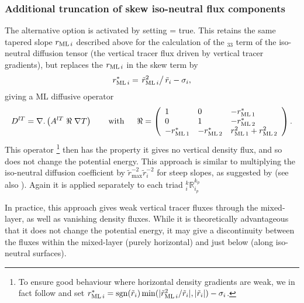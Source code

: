 \documentclass[../tex_main/NEMO_manual]{subfiles}
\begin{document}
\subsubsection{Additional truncation of skew iso-neutral flux components}
\label{subsec:Gerdes-taper}
The alternative option is activated by setting  = true.
This retains the same tapered slope $r_{\mathrm{ML}\,i}$  described above for the calculation of the $_{33}$ term of
the iso-neutral diffusion tensor (the vertical tracer flux driven by vertical tracer gradients),
but replaces the $r_{\mathrm{ML}\,i}$ in the skew term by
\begin{equation}
  \label{eq:rm*}
  r_{\mathrm{ML}\,i}^*=\left.\tilde{r}_{\mathrm{ML}\,i}^2\right/\tilde{r}_i-\sigma_i,
\end{equation}
giving a ML diffusive operator
\begin{equation} \label{eq:iso_tensor_ML2}
D^{lT}=\nabla {\rm {\bf .}}\left( {A^{lT}\;\Re \;\nabla T} \right) \qquad
\mbox{with}\quad \;\;\Re =\left( {{\begin{array}{*{20}c}
 1 \hfill & 0 \hfill & {-\rML[1]^*}\hfill \\
 0 \hfill & 1 \hfill & {-\rML[2]^*} \hfill \\
 {-\rML[1]^*}\hfill &   {-\rML[2]^*} \hfill & {\rML[1]^2+\rML[2]^2} \hfill \\
\end{array} }} \right).
\end{equation}
This operator
\footnote{
  To ensure good behaviour where horizontal density gradients are weak,
  we in fact follow \citet{Gerdes1991} and
  set $r_{\mathrm{ML}\,i}^*=\mathrm{sgn}(\tilde{r}_i)\min(|\tilde{r}_{\mathrm{ML}\,i}^2/\tilde{r}_i|,|\tilde{r}_i|)-\sigma_i$.}
then has the property it gives no vertical density flux, and so does not change the potential energy.
This approach is similar to multiplying the iso-neutral diffusion coefficient by
$\tilde{r}_{\mathrm{max}}^{-2}\tilde{r}_i^{-2}$ for steep slopes,
as suggested by \citet{Gerdes1991} (see also \citet{Griffies_Bk04}).
Again it is applied separately to each triad $_i^k\mathbb{R}_{i_p}^{k_p}$

In practice, this approach gives weak vertical tracer fluxes through the mixed-layer,
as well as vanishing density fluxes.
While it is theoretically advantageous that it does not change the potential energy,
it may give a discontinuity between the fluxes within the mixed-layer (purely horizontal) and
just below (along iso-neutral surfaces).
\end{document}
